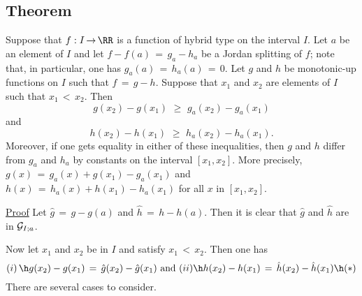 \V

             \subsection{\small{\bf Theorem}}
            \label{ThmF40.130}

        Suppose that $f:I \,{\rightarrow}\, {\RR}$ is a function of hybrid type on the interval $I$.
    Let $a$ be an element of $I$ and let $f-f(a) \,=\, g_{a}-h_{a}$ be a Jordan splitting of $f$;
    note that, in particular, one has $g_{a}(a) \,=\, h_{a}(a) \,=\, 0$.
    Let $g$ and $h$ be monotonic-up functions on $I$ such that $f \,=\, g-h$.
    Suppose that $x_{1}$ and $x_{2}$ are elements of $I$ such that $x_{1}\,<\,x_{2}$. Then
        \begin{equation}
        \label{IneqF.80}
        g(x_{2})-g(x_{1})\,\,{\geq}\,\,g_{a}(x_{2})-g_{a}(x_{1})
        \end{equation}
    and
        \begin{equation}
        \label{IneqF.90}
        h(x_{2})-h(x_{1})\,\,{\geq}\,\,h_{a}(x_{2})-h_{a}(x_{1}).
        \end{equation}
    Moreover, if one gets equality in either of these inequalities, then $g$ and $h$ differ from $g_{a}$ and $h_{a}$ by constants on the interval $[x_{1},x_{2}]$.
    More precisely, $g(x) \,=\, g_{a}(x) + g(x_{1})-g_{a}(x_{1})$ and $h(x) \,=\, h_{a}(x) + h(x_{1})-h_{a}(x_{1})$ for all $x$ in $[x_{1},x_{2}]$.

\V

        \underline{Proof} Let $\hat{g} \,=\, g-g(a)$ and $\hat{h} \,=\, h-h(a)$.
    Then it is clear that $\hat{g}$ and $\hat{h}$ are in ${\cal G}_{I;a}$.

        Now let $x_{1}$ and $x_{2}$ be in $I$ and satisfy $x_{1}\,<\,x_{2}$. Then one has
        \begin{displaymath}
         (i)\, \h g(x_{2}) - g(x_{1}) \,=\, \hat{g}(x_{2}) - \hat{g}(x_{1})
    \mbox{ and }
         (ii)  \h h(x_{2}) - h(x_{1}) \,=\, \hat{h}(x_{2}) - \hat{h}(x_{1})
    \h ({\ast})
        \end{displaymath}
    There are several cases to consider.

